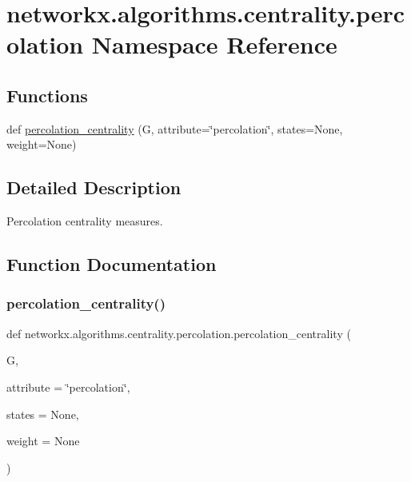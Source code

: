 \hypertarget{namespacenetworkx_1_1algorithms_1_1centrality_1_1percolation}{}\section{networkx.\+algorithms.\+centrality.\+percolation Namespace Reference}
\label{namespacenetworkx_1_1algorithms_1_1centrality_1_1percolation}
\subsection*{Functions}
\begin{DoxyCompactItemize}
\item 
def \hyperlink{namespacenetworkx_1_1algorithms_1_1centrality_1_1percolation_a88094c8daf4cff6d28fe2aba48fa4708}{percolation\+\_\+centrality} (G, attribute=\char`\"{}percolation\char`\"{}, states=None, weight=None)
\end{DoxyCompactItemize}


\subsection{Detailed Description}
\begin{DoxyVerb}Percolation centrality measures.\end{DoxyVerb}
 

\subsection{Function Documentation}
\mbox{\label{namespacenetworkx_1_1algorithms_1_1centrality_1_1percolation_a88094c8daf4cff6d28fe2aba48fa4708}} 
\subsubsection{\texorpdfstring{percolation\+\_\+centrality()}{percolation\_centrality()}}
{\footnotesize\ttfamily def networkx.\+algorithms.\+centrality.\+percolation.\+percolation\+\_\+centrality (\begin{DoxyParamCaption}\item[{}]{G,  }\item[{}]{attribute = {\ttfamily \char`\"{}percolation\char`\"{}},  }\item[{}]{states = {\ttfamily None},  }\item[{}]{weight = {\ttfamily None} }\end{DoxyParamCaption})}

